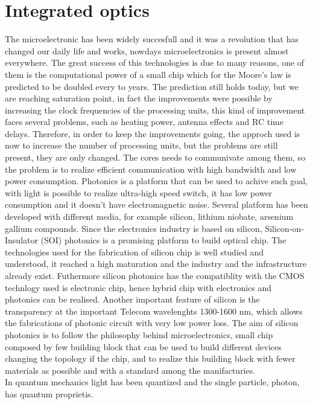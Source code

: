 \documentclass[10pt]{book}
\begin{document}
\section{Integrated optics}
The microelectronic has been widely succesfull and it was a revolution that has changed our daily life and works, nowdays microelectronics is present almost everywhere. The great success of this technologies is due to many reasons, one of them is the computational power of a small chip which for the Moore's law is predicted to be doubled every to years. The prediction still holds today, but we are reaching saturation point, in fact the improvements were possible by increasing the clock frequencies of the processing units, this kind of improvement faces several problems, such as heating power, antenna effects and RC time delays. Therefore, in order to keep the improvements going, the approch used is now to increase the number of processing units, but the problems are still present, they are only changed. The cores needs to communivate among them, so the problem is to realize efficient communication with high bandwidth and low power consumption. Photonics is a platform that can be used to achive such goal, with light is possible to realize ultra-high speed switch, it has low power consumption and it doesn't have electromagnetic noise. Several platform has been developed with different media, for example silicon, lithium niobate, arsenium gallium compounds. Since the electronics industry is based on silicon, Silicon-on-Insulator (SOI) photonics is a promising platform to build optical chip. The technologies used for the fabrication of silicon chip is well studied and understood, it reached a high maturation and the industry and the infrastructure already exist. Futhermore silicon photonics has the compatiblity with the CMOS technlogy used is electronic chip, hence hybrid chip with electronics and photonics can be realised. Another important feature of silicon is the transparency at the important Telecom wavelenghts 1300-1600 nm, which allows the fabrications of photonic circuit with very low power loss. The aim of silicon photonics is to follow the philosophy behind microelectronics, small chip composed by few building block that can be used to build different devices changing the topology if the chip, and to realize this building block with fewer materials as possible and with a standard among the manifacturies.\\
In quantum mechanics light has been quantized and the single particle, photon, has quantum proprietis.\\
\end{document}
